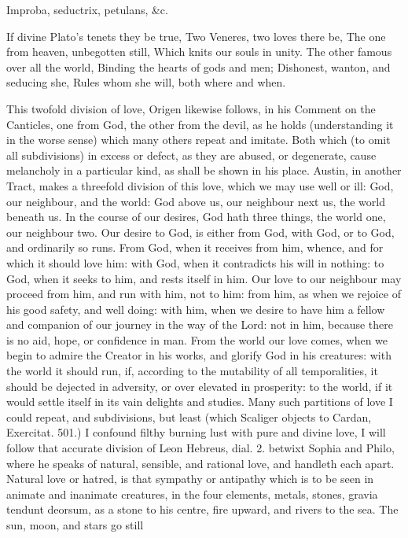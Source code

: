 {Improba, seductrix, petulans, \&c.

If divine Plato's tenets they be true,
Two Veneres, two loves there be,
The one from heaven, unbegotten still,
Which knits our souls in unity.
The other famous over all the world,
Binding the hearts of gods and men;
Dishonest, wanton, and seducing she,
Rules whom she will, both where and when.

This twofold division of love, Origen likewise follows, in his Comment
on the Canticles, one from God, the other from the devil, as he holds
(understanding it in the worse sense) which many others repeat and
imitate. Both which (to omit all subdivisions) in excess or defect, as
they are abused, or degenerate, cause melancholy in a particular kind,
as shall be shown in his place. Austin, in another Tract, makes a
threefold division of this love, which we may use well or ill:
God, our neighbour, and the world: God above us, our neighbour
next us, the world beneath us. In the course of our desires, God hath
three things, the world one, our neighbour two. Our desire to God, is
either from God, with God, or to God, and ordinarily so runs. From God,
when it receives from him, whence, and for which it should love him:
with God, when it contradicts his will in nothing: to God, when it
seeks to him, and rests itself in him. Our love to our neighbour may
proceed from him, and run with him, not to him: from him, as when we
rejoice of his good safety, and well doing: with him, when we desire to
have him a fellow and companion of our journey in the way of the Lord:
not in him, because there is no aid, hope, or confidence in man. From
the world our love comes, when we begin to admire the Creator in his
works, and glorify God in his creatures: with the world it should run,
if, according to the mutability of all temporalities, it should be
dejected in adversity, or over elevated in prosperity: to the world, if
it would settle itself in its vain delights and studies. Many such
partitions of love I could repeat, and subdivisions, but least (which
Scaliger objects to Cardan, Exercitat. 501.) I confound filthy
burning lust with pure and divine love, I will follow that accurate
division of Leon Hebreus, dial. 2. betwixt Sophia and Philo, where he
speaks of natural, sensible, and rational love, and handleth each
apart. Natural love or hatred, is that sympathy or antipathy which is
to be seen in animate and inanimate creatures, in the four elements,
metals, stones, gravia tendunt deorsum, as a stone to his centre, fire
upward, and rivers to the sea. The sun, moon, and stars go still
}
